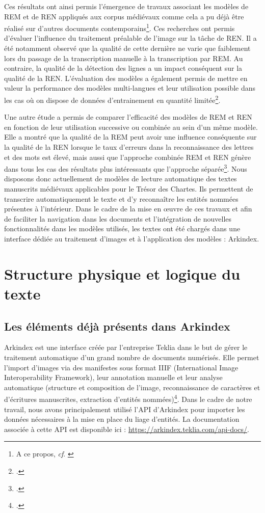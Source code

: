 \documentclass[a4paper,12pt,twoside]{book}
\begin{document}
	Ces résultats ont ainsi permis l'émergence de travaux associant les modèles de REM et de REN appliqués aux corpus médiévaux comme cela a pu déjà être réalisé sur d'autres documents contemporains\footnote{A ce propos, \textit{cf}. \cite{scheithauer_reconnaissanc_2021}}. Ces recherches ont permis d'évaluer l'influence du traitement préalable de l'image sur la tâche de REN. Il a été notamment observé que la qualité de cette dernière ne varie que faiblement lors du passage de la transcription manuelle à la transcription par REM. Au contraire, la qualité de la détection des lignes a un impact conséquent sur la qualité de la REN. L'évaluation des modèles a également permis de mettre en valeur la performance des modèles multi-langues et leur utilisation possible dans les cas où on dispose de données d'entrainement en quantité limitée\footcite{monroc_comprehensive_2022}. 
	
	Une autre étude a permis de comparer l'efficacité des modèles de REM et REN en fonction de leur utilisation successive ou combinée au sein d'un même modèle. Elle a montré que la qualité de la REM peut avoir une influence conséquente sur la qualité de la REN lorsque le taux d'erreurs dans la reconnaissance des lettres et des mots est élevé, mais aussi que l'approche combinée REM et REN génère dans tous les cas des résultats plus intéressants que l'approche séparée\footcite{boros_comparison_2020}. Nous disposons donc actuellement de modèles de lecture automatique des textes manuscrits médiévaux applicables pour le Trésor des Chartes. Ils permettent de transcrire automatiquement le texte et d'y reconnaître les entités nommées présentes à l'intérieur. Dans le cadre de la mise en œuvre de ces travaux et afin de faciliter la navigation dans les documents et l'intégration de nouvelles fonctionnalités dans les modèles utilisés, les textes ont été chargés dans une interface dédiée au traitement d'images et à l'application des modèles : Arkindex.
	
	\section{Structure physique et logique du texte}
	
	\subsection{Les éléments déjà présents dans Arkindex}
	
	Arkindex est une interface créée par l'entreprise Teklia dans le but de gérer le traitement automatique d'un grand nombre de documents numérisés. Elle permet l'import d'images via des manifestes sous format IIIF (International Image Interoperability Framework), leur annotation manuelle et leur analyse automatique (structure et composition de l'image, reconnaissance de caractères et d'écritures manuscrites, extraction d'entités nommées)\footcite{noauthor_teklia_nodate}. Dans le cadre de notre travail, nous avons principalement utilisé l'API d'Arkindex pour importer les données nécessaires à la mise en place du liage d'entités. La documentation associée à cette API est disponible ici : \url{https://arkindex.teklia.com/api-docs/}.
	
\end{document}
